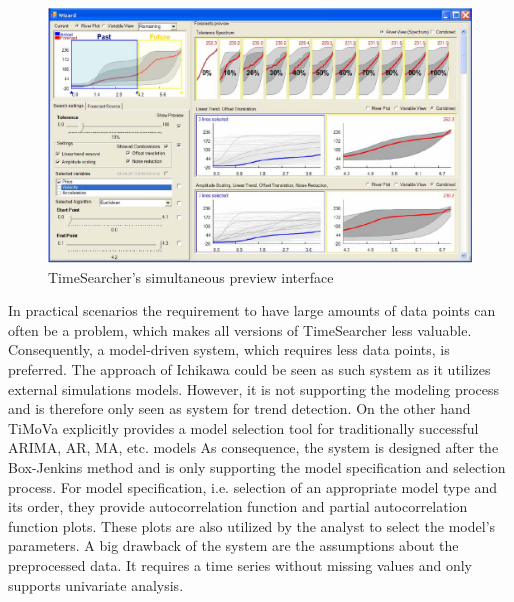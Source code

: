\documentclass[electronic]{vgtc}             %
\begin{document}
\begin{figure}[htb]
	\centering
	\includegraphics[width=\columnwidth]{TimeSearcher}
	\caption{TimeSearcher's \cite{buono:2007} simultaneous preview interface
	}
	\label{fig:timesearcher}
\end{figure}

In practical scenarios the requirement to have large amounts of data points can often be a problem, which makes all versions of TimeSearcher \cite{Hochheiser:2004, buono:2005, buono:2007} less valuable.
Consequently, a model-driven system, which requires less data points, is preferred.
The approach of Ichikawa \cite{ichikawa:2002} could be seen as such system as it utilizes external simulations models.
However, it is not supporting the modeling process and is therefore only seen as system for trend detection.
On the other hand TiMoVa \cite{boegl:2013} explicitly provides a model selection tool for traditionally successful ARIMA, AR, MA, etc. models
As consequence, the system is designed after the Box-Jenkins method and is only supporting the model specification and selection process.
For model specification, i.e. selection of an appropriate model type and its order, they provide autocorrelation function and partial autocorrelation function plots.
These plots are also utilized by the analyst to select the model's parameters.
A big drawback of the system are the assumptions about the preprocessed data. 
It requires a time series without missing values and only supports univariate analysis.

\end{document}
